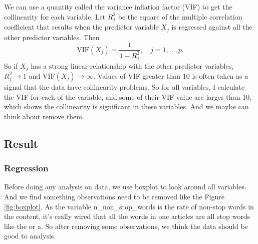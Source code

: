 \documentclass[12pt]{article}
\begin{document}
    We can use a quantity called the variance inflation factor (VIF) to get the collinearity for each variable. Let $R^2_j$ be the square of the multiple correlation coefficient that results when the predictor variable $X_j$ is regressed against all the other predictor variables. Then $$\text{VIF}(X_j) = \frac{1}{1 - R^2_j}, \quad j = 1, ... , p.$$ So if $X_j$ has a strong linear relationship with the other predictor variables, $R^2_j \to 1$ and $\text{VIF}(X_j) \to \infty$. Values of VIF greater than 10 is often taken as a signal that the data have collinearity problems.\cite{vif} So for all variables, I calculate the VIF for each of the variable, and some of their VIF value are larger than 10, which shows the collinearity is significant in these variables. And we maybe can think about remove them. \\ 
    
\subsection{Result}
\subsubsection{Regression}
Before doing any analysis on data, we use boxplot to look around all variables. And we find something observations need to be removed like the Figure \ref{fig:boxplot}. As the variable n{\_}non{\_}stop{\_}words is the rate of non-stop words in the content, it’s really wired that all the words in one articles are all stop words like the or a. So after removing some observations, we think the data should be good to analysis.
\end{document}
